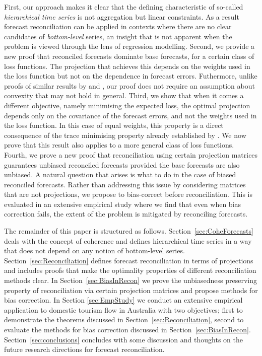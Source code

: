 \documentclass[12pt]{article}
\theoremstyle{definition}
\begin{document}
First, our approach makes it clear that the defining characteristic of so-called \emph{hierarchical time series} is not aggregation but linear constraints. As a result forecast reconciliation can be applied in contexts where there are no clear candidates of \emph{bottom-level} series, an insight that is not apparent when the problem is viewed through the lens of regression modelling. Second, {\color{blue} we provide a new proof that reconciled forecasts dominate base forecasts, for a certain class of loss functions. The projection that achieves this depends on the weights used in the loss function but not on the dependence in forecast errors.}  Futhermore, unlike {\color{blue} proofs of similar results by} \citet{VanErven2015a} and \citet{WicEtAl2019}, our proof does not require an assumption about convexity that may not hold in general.  {\color{blue} Third, we show that when it comes a different objective, namely minimising the expected loss, the optimal projection depends only on the covariance of the forecast errors, and not the weights used in the loss function.  In this case of equal weights, this property is a direct consequence of the trace minimising property already established by \cite{WicEtAl2019}. We now prove that this result also applies to a more general class of loss functions.  Fourth}, we prove a new proof that reconciliation using certain projection matrices guarantees unbiased reconciled forecasts provided the base forecasts are also unbiased. A natural question that arises is what to do in the case of biased reconciled forecasts. Rather than addressing this issue by considering matrices that are not projections, we propose to bias-correct before reconciliation. This is evaluated in an extensive empirical study where we find that even when bias correction fails, the extent of the problem is mitigated by reconciling forecasts.

The remainder of this paper is structured as follows. Section~\ref{sec:CoheForecasts} deals with the concept of coherence and defines hierarchical time series in a way that does not depend on any notion of bottom-level series. Section~\ref{sec:Reconciliation} defines forecast reconciliation in terms of projections and includes proofs that make the optimality properties of different reconciliation methods clear. In Section~\ref{sec:BiasInRecon} we prove the unbiasedness preserving property of reconciliation via certain projection matrices and propose methods for bias correction. In Section \ref{sec:EmpStudy} we conduct an extensive empirical application to domestic tourism flow in Australia with two objectives; first to demonstrate the theorems discussed in Section~\ref{sec:Reconciliation}, second to evaluate the methods for bias correction discussed in Section~\ref{sec:BiasInRecon}. Section~\ref{sec:conclusions} concludes with some discussion and thoughts on the future research directions {\color{blue}for} forecast reconciliation.
\end{document}
